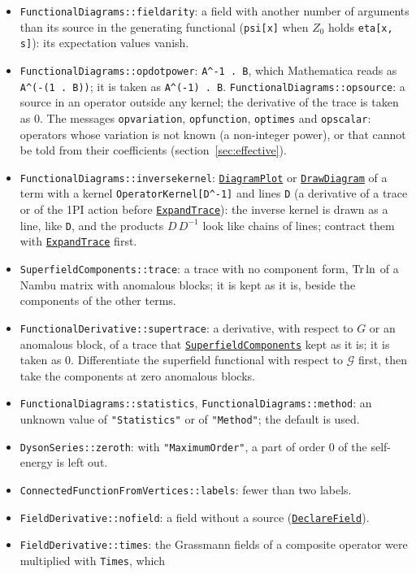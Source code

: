 \documentclass[11pt,a4paper]{article}
\newcommand{\pkg}[1]{\texttt{#1}}
\newcommand{\fnref}[1]{\hyperref[fn:#1]{\pkg{#1}}}
\newcommand{\opt}[1]{\texttt{"#1"}}
\begin{document}
\begin{itemize}
  declare \pkg{G} too, or its terms with the labels exchanged are not recognized as equal.
\item \pkg{FunctionalDiagrams::fieldarity}: a field with another number of arguments than its source in the generating
  functional (\pkg{psi[x]} when $Z_0$ holds \pkg{eta[x, s]}): its expectation values vanish.
\item \pkg{FunctionalDiagrams::opdotpower}: \pkg{A\^{}-1 . B}, which Mathematica reads as \pkg{A\^{}(-(1 . B))}; it is taken as
  \pkg{A\^{}(-1) . B}. \pkg{FunctionalDiagrams::opsource}: a source in an operator outside any kernel; the derivative of
  the trace is taken as 0. The messages \pkg{opvariation}, \pkg{opfunction}, \pkg{optimes} and \pkg{opscalar}:
  operators whose variation is not known (a non-integer power), or that cannot be told from their coefficients
  (section~\ref{sec:effective}).
\item \pkg{FunctionalDiagrams::inversekernel}: \fnref{DiagramPlot} or \fnref{DrawDiagram} of a term with a kernel
  \pkg{OperatorKernel[D\^{}-1]} and lines \pkg{D} (a derivative of a trace or of the 1PI action before \fnref{ExpandTrace}):
  the inverse kernel is drawn as a line, like \pkg{D}, and the products $D\,D^{-1}$ look like chains of lines; contract them
  with \fnref{ExpandTrace} first.
\item \pkg{SuperfieldComponents::trace}: a trace with no component form, ${\rm Tr}\ln$ of a Nambu matrix with anomalous
  blocks; it is kept as it is, beside the components of the other terms.
\item \pkg{FunctionalDerivative::supertrace}: a derivative, with respect to $G$ or an anomalous block, of a trace that
  \fnref{SuperfieldComponents} kept as it is; it is taken as 0. Differentiate the superfield functional with respect to
  $\mathcal G$ first, then take the components at zero anomalous blocks.
\item \pkg{FunctionalDiagrams::statistics}, \pkg{FunctionalDiagrams::method}: an unknown value of \opt{Statistics} or of
  \opt{Method}; the default is used.
\item \pkg{DysonSeries::zeroth}: with \opt{MaximumOrder}, a part of order 0 of the self-energy is left out.
\item \pkg{ConnectedFunctionFromVertices::labels}: fewer than two labels.
\item \pkg{FieldDerivative::nofield}: a field without a source (\fnref{DeclareField}).
\item \pkg{FieldDerivative::times}: the Grassmann fields of a composite operator were multiplied with \pkg{Times}, which

\end{itemize}
\end{document}
